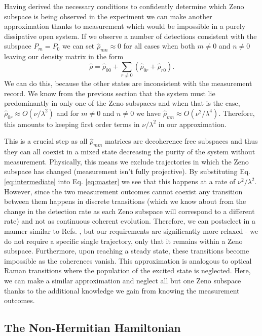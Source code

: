 Having derived the necessary conditions to confidently determine which
Zeno subspace is being observed in the experiment we can make another
approximation thanks to measurement which would be impossible in a
purely dissipative open system. If we observe a number of detections
consistent with the subspace $P_m = P_0$ we can set
$\hat{\rho}_{mn} \approx 0$ for all cases when both $m \ne 0$ and
$n \ne 0$ leaving our density matrix in the form
\begin{equation}
  \label{eq:approxrho}
  \hat{\rho} = \hat{\rho}_{00} + \sum_{r\ne0} (\hat{\rho}_{0r} +
  \hat{\rho}_{r0}).
\end{equation}
We can do this, because the other states are inconsistent with the
measurement record. We know from the previous section that the system
must lie predominantly in only one of the Zeno subspaces and when that
is the case, $\hat{\rho}_{0r} \approx O(\nu/\lambda^2)$ and for
$m \ne 0$ and $n \ne 0$ we have
$\hat{\rho}_{mn} \approx O(\nu^2/\lambda^4)$. Therefore, this amounts
to keeping first order terms in $\nu/\lambda^2$ in our approximation.

This is a crucial step as all $\hat{\rho}_{mm}$ matrices are
decoherence free subspaces and thus they can all coexist in a mixed
state decreasing the purity of the system without
measurement. Physically, this means we exclude trajectories in which
the Zeno subspace has changed (measurement isn't fully projective). By
substituting Eq. \eqref{eq:intermediate} into Eq. \eqref{eq:master} we
see that this happens at a rate of $\nu^2 / \lambda^2$. However, since
the two measurement outcomes cannot coexist any transition between
them happens in discrete transitions (which we know about from the
change in the detection rate as each Zeno subspace will correspond to
a different rate) and not as continuous coherent evolution. Therefore,
we can postselect in a manner similar to Refs. \cite{otterbach2014,
  lee2014prx, lee2014prl}, but our requirements are significantly more
relaxed - we do not require a specific single trajectory, only that it
remains within a Zeno subspace. Furthermore, upon reaching a steady
state, these transitions become impossible as the coherences
vanish. This approximation is analogous to optical Raman transitions
where the population of the excited state is neglected. Here, we can
make a similar approximation and neglect all but one Zeno subspace
thanks to the additional knowledge we gain from knowing the
measurement outcomes.

\subsection{The Non-Hermitian Hamiltonian}

